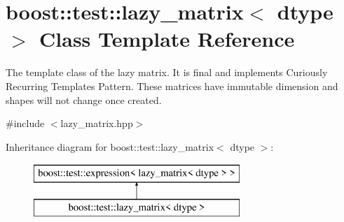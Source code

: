 \hypertarget{classboost_1_1test_1_1lazy__matrix}{}\section{boost\+::test\+::lazy\+\_\+matrix$<$ dtype $>$ Class Template Reference}
\label{classboost_1_1test_1_1lazy__matrix}


The template class of the lazy matrix. It is final and implements Curiously Recurring Templates Pattern. These matrices have immutable dimension and shapes will not change once created.  




{\ttfamily \#include $<$lazy\+\_\+matrix.\+hpp$>$}

Inheritance diagram for boost\+::test\+::lazy\+\_\+matrix$<$ dtype $>$\+:\begin{figure}[H]
\begin{center}
\leavevmode
\includegraphics[height=2.000000cm]{classboost_1_1test_1_1lazy__matrix}
\end{center}
\end{figure}
